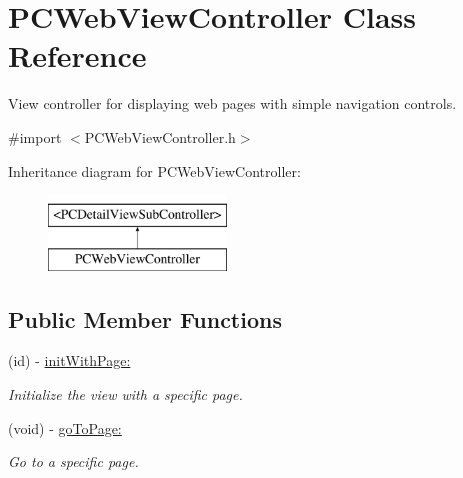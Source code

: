 \hypertarget{interface_p_c_web_view_controller}{
\section{PCWebViewController Class Reference}
\label{interface_p_c_web_view_controller}
}


View controller for displaying web pages with simple navigation controls.  




{\ttfamily \#import $<$PCWebViewController.h$>$}

Inheritance diagram for PCWebViewController:\begin{figure}[h!]
\begin{center}
\leavevmode
\includegraphics[height=2.000000cm]{kegg_doc/interface_p_c_web_view_controller}
\end{center}
\end{figure}
\subsection*{Public Member Functions}
\begin{DoxyCompactItemize}
\item 
\hypertarget{interface_p_c_web_view_controller_a2650e78e4a28fa64494e10bb8e4663f0}{
(id) -\/ \hyperlink{interface_p_c_web_view_controller_a2650e78e4a28fa64494e10bb8e4663f0}{initWithPage:}}
\label{interface_p_c_web_view_controller_a2650e78e4a28fa64494e10bb8e4663f0}

\begin{DoxyCompactList}\small\item\em Initialize the view with a specific page. \end{DoxyCompactList}\item 
\hypertarget{interface_p_c_web_view_controller_ade56812baf7b39fbce9828726762f72e}{
(void) -\/ \hyperlink{interface_p_c_web_view_controller_ade56812baf7b39fbce9828726762f72e}{goToPage:}}
\label{interface_p_c_web_view_controller_ade56812baf7b39fbce9828726762f72e}

\begin{DoxyCompactList}\small\item\em Go to a specific page. \end{DoxyCompactList}\end{DoxyCompactItemize}

